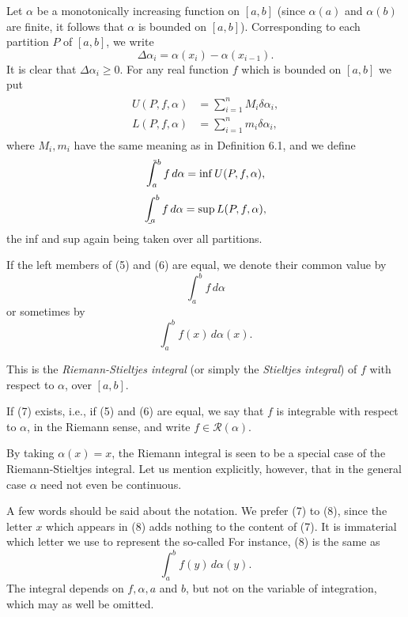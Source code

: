 \documentclass[../poma-notes.tex]{subfiles}
\begin{document}
\begin{definition}
  Let $\alpha$ be a monotonically increasing function on $[a,b]$ (since $\alpha(a)$ and $\alpha(b)$ are finite,
  it follows that $\alpha$ is bounded on $[a,b]$). Corresponding to each partition $P$ of $[a,b]$, we write
  \[
    \Delta\alpha_i = \alpha(x_i) - \alpha(x_{i-1}).
  \]
  It is clear that $\Delta\alpha_i \ge 0$. For any real function $f$ which is bounded on $[a,b]$ we put
  \begin{align*}
    \begin{split}
      U(P,f,\alpha) &= \sum_{i=1}^{n} M_i \delta\alpha_i, \\
      L(P,f,\alpha) &= \sum_{i=1}^{n} m_i \delta\alpha_i,
    \end{split}
  \end{align*}
  where $M_i, m_i$ have the same meaning as in Definition 6.1, and we define
  \begin{equation}
    \tint_a^b f\,d\alpha = \inf U(P,f,\alpha),
  \end{equation}
  \begin{equation}
    \bint_a^b f\,d\alpha = \sup L(P,f,\alpha),
  \end{equation}
  the inf and sup again being taken over all partitions.

  If the left members of (5) and (6) are equal, we denote their common value by
  \begin{equation}
    \int_a^b f\,d\alpha
  \end{equation}
  or sometimes by
  \begin{equation}
    \int_a^b f(x)\,d\alpha(x).
  \end{equation}

  This is the \textit{Riemann-Stieltjes integral} (or simply the \textit{Stieltjes integral}) of $f$ with respect to
  $\alpha$, over $[a,b]$.

  If (7) exists, i.e., if (5) and (6) are equal, we say that $f$ is integrable with respect to $\alpha$, in the Riemann
  sense, and write $f\in\mathscr{R}(\alpha)$.

  By taking $\alpha(x)=x$, the Riemann integral is seen to be a special case of the Riemann-Stieltjes integral. Let us
  mention explicitly, however, that in the general case $\alpha$ need not even be continuous.

  A few words should be said about the notation. We prefer (7) to (8), since the letter $x$ which appears in (8) adds nothing
  to the content of (7). It is immaterial which letter we use to represent the so-called 
  For instance, (8) is the same as
  \[
    \int_a^b f(y)\,d\alpha(y).
  \]
  The integral depends on $f, \alpha, a$ and $b$, but not on the variable of integration, which may as well be omitted.


\end{definition}
\end{document}
